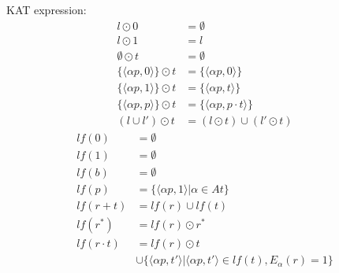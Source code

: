 \documentclass[10pt]{article}
\begin{document}
\hfill
\begin{minipage}{0.45\textwidth}
KAT expression:\\
\begin{align*}
    l\odot 0&=\emptyset\\
    l\odot 1&= l\\
    \emptyset\odot t&=\emptyset\\
    \{\langle \alpha p,0\rangle\}\odot t&=\{\langle \alpha p,0\rangle\}\\
    \{\langle \alpha p,1\rangle\}\odot t&=\{\langle \alpha p,t\rangle\}\\
    \{\langle \alpha p,p\rangle\}\odot t&=\{\langle \alpha p,p\cdot t\rangle\}\\
    (l\cup l')\odot t&=(l\odot t)\cup (l'\odot t)
\end{align*}
\begin{align*}
    lf(0)&=\emptyset\\
    lf(1)&=\emptyset\\
    lf(b)&=\emptyset\\
    lf(p)&=\{\langle \alpha p,1\rangle|\alpha\in At\}\\
    lf(r+t)&=lf(r)\cup lf(t)\\
    lf(r^*)&=lf(r)\odot r^*\\
    lf(r\cdot t)&=lf(r)\odot t\\
    &\cup \{\langle \alpha p,t'\rangle|\langle \alpha p,t'\rangle\in lf(t), E_{\alpha}(r)=1\}
\end{align*}
\end{minipage}%
\end{document}
